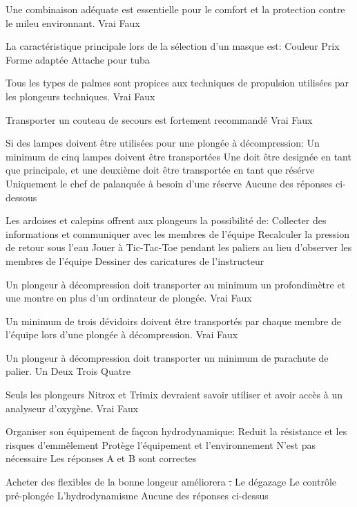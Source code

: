 \documentclass[english,10pt,a4paper,twoside]{article}
\begin{document}
\begin{outline}
		\1 Une combinaison adéquate est essentielle pour le comfort et la protection contre le mileu environnant.
			\2 Vrai
			\2 Faux

		\1 La caractéristique principale lors de la sélection d'un masque est:
			\2 Couleur
			\2 Prix
			\2 Forme adaptée
			\2 Attache pour tuba

		\1 Tous les types de palmes sont propices aux techniques de propulsion utilisées par les plongeurs techniques.
			\2 Vrai
			\2 Faux

		\1 Transporter un couteau de secours est fortement recommandé
			\2 Vrai
			\2 Faux

		\1 Si des lampes doivent être utilisées pour une plongée à décompression:
			\2 Un minimum de cinq lampes doivent être transportées
			\2 Une doit être designée en tant que principale, et une deuxième doit être transportée en tant que résérve
			\2 Uniquement le chef de palanquée à besoin d'une réserve
			\2 Aucune des réponses ci-dessous

		\1 Les ardoises et calepins offrent aux plongeurs la possibilité de:
			\2 Collecter des informations et communiquer avec les membres de l'équipe
			\2 Recalculer la pression de retour sous l'eau
			\2 Jouer à Tic-Tac-Toe pendant les paliers au lieu d'observer les membres de l'équipe
			\2 Dessiner des caricatures de l'instructeur

		\1 Un plongeur à décompression doit transporter au minimum un profondimètre et une montre en plus d'un ordinateur de plongée.
			\2 Vrai
			\2 Faux

		\1 Un minimum de trois dévidoirs doivent être transportés par chaque membre de l'équipe lors d'une plongée à décompression.
			\2 Vrai
			\2 Faux

		\1 Un plongeur à décompression doit transporter un minimum de \st parachute de palier.
			\2 Un
			\2 Deux
			\2 Trois
			\2 Quatre

		\1 Seuls les plongeurs Nitrox et Trimix devraient savoir utiliser et avoir accès à un analyseur d'oxygène.
			\2 Vrai
			\2 Faux

		\1 Organiser son équipement de façcon hydrodynamique:
			\2 Reduit la résistance et les risques d'emmêlement
			\2 Protège l'équipement et l'environnement
			\2 N'est pas nécessaire
			\2 Les réponses A et B sont correctes

		\1 Acheter des flexibles de la bonne longeur améliorera \st.
			\2 Le dégazage
			\2 Le contrôle pré-plongée
			\2 L'hydrodynamisme
			\2 Aucune des réponses ci-dessus


\end{outline}
\end{document}
